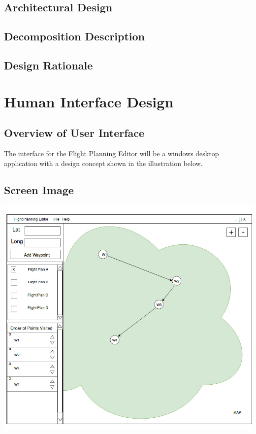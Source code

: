 \documentclass[12pt, letterpaper]{article}
\begin{document}
  \subsection{Architectural Design}
  \subsection{Decomposition Description}
  \subsection{Design Rationale}

\section{Human Interface Design}

\subsection{Overview of User Interface}
The interface for the Flight Planning Editor will be a windows desktop application with a design concept shown in the illustration below. 
	\subsection{Screen Image}
\includegraphics{FlightPlanning_Interface}
\end{document}

